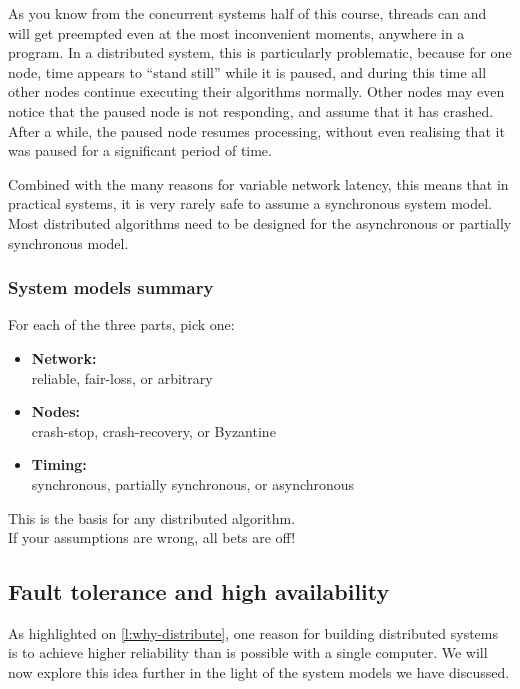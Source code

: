 As you know from the concurrent systems half of this course, threads can and will get preempted even at the most inconvenient moments, anywhere in a program.
In a distributed system, this is particularly problematic, because for one node, time appears to ``stand still'' while it is paused, and during this time all other nodes continue executing their algorithms normally.
Other nodes may even notice that the paused node is not responding, and assume that it has crashed.
After a while, the paused node resumes processing, without even realising that it was paused for a significant period of time.

Combined with the many reasons for variable network latency, this means that in practical systems, it is very rarely safe to assume a synchronous system model.
Most distributed algorithms need to be designed for the asynchronous or partially synchronous model.

\begin{frame}
    \label{s:model-summary}
    \frametitle{System models summary}
    For each of the three parts, pick one:\\
    \begin{itemize}
        \item \textbf{Network:}\\
            reliable, fair-loss, or arbitrary\\[1em]
        \item \textbf{Nodes:}\\
            crash-stop, crash-recovery, or Byzantine\\[1em]
        \item \textbf{Timing:}\\
            synchronous, partially synchronous, or asynchronous\\[1em]
    \end{itemize}
    This is the basis for any distributed algorithm.\\
    If your assumptions are wrong, all bets are off!
\end{frame}
\label{l:model-summary}

\subsection{Fault tolerance and high availability}\label{sec:fault-tolerance}

As highlighted on \autoref{l:why-distribute}, one reason for building distributed systems is to achieve higher reliability than is possible with a single computer.
We will now explore this idea further in the light of the system models we have discussed.

